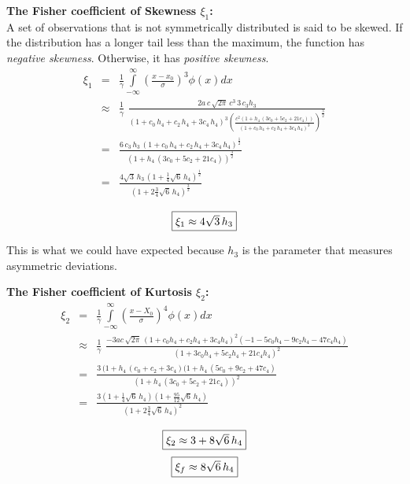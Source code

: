 \documentclass[10pt,a4paper]{report}
\def\ampfac{\left(1+c_0\,h_4+c_2\,h_4+3c_4\,h_4\right)}
\begin{document}
\begin{flushleft}
\vspace{1cm}
{\bf The Fisher coefficient of Skewness $\xi_1$:}\\
A set of observations that is not symmetrically distributed is said to be skewed.
If the distribution has a longer tail less than the maximum,
the function has {\it negative skewness}. Otherwise, it has
{\it positive skewness}.
\begin{eqnarray*}
\xi_1 &=& \frac{1}{\gamma}\int\limits_{-\infty}^{\infty} \left({\frac{x-x_0}{\sigma}}\right)^{3} \phi(x) dx\\
&\approx & \frac{1}{\gamma}\,\,\frac{ 2a\,c\, \sqrt{2\pi}\,c^3\,3\,c_3h_3}
{\ampfac^3 {\left(\frac{c^2\left(1+h_4\,(3c_0+5c_2+21c_4)\right)}{\ampfac^3} \right)}^\frac{3}{2} }\\ 
&=& \frac{6\,c_3\,h_3\, \ampfac^\frac{1}{2} }
{{\left(1+h_4\,(3c_0+5c_2+21c_4)\right)}^\frac{3}{2}}\\
&=& \frac{4\sqrt{3}\,h_3\, {(1+\frac{1}{4}\sqrt{6}\,h_4)}^\frac{1}{2}}
{{\left(1+2\frac{3}{4}\sqrt{6}\,h_4\right)}^\frac{3}{2}}
\end{eqnarray*} 

\begin{equation}
\framebox{$\xi_1 \approx 4\sqrt{3}\,h_3$}
\end{equation} 

This is what we could have expected because $h_3$ is the parameter that
measures asymmetric deviations.

\vspace{1cm}
{\bf The Fisher coefficient of Kurtosis $\xi_2$:}
\begin{eqnarray*}
\xi_2 &=& \frac{1}{\gamma}\int\limits_{-\infty}^{\infty} \left({\frac{x-X_0}{\sigma}}\right)^{4} \phi(x) dx\\
&\approx & \frac{1}{\gamma}\,\, \frac{-3ac\,\sqrt{2\pi}\,{\left(1+c_0h_4+c_2h_4+3c_4h_4 \right)}^2
 \left(-1-5c_0h_4-9c_2h_4-47c_4h_4\right)}
{{\left(1+3c_0h_4+5c_2h_4+21c_4h_4 \right)}^2}\\
&=& \frac{3\,(1+h_4\,(c_0+c_2+3c_4)(1+h_4\,(5c_0+9c_2+47c_4)}
{{\left(1+h_4\,(3c_0+5c_2+21c_4)\right)}^2}\\
&=& \frac{3(1+\frac{1}{4}\sqrt{6}\,h_4)(1+\frac{95}{12}\sqrt{6}\,h_4)}
{{\left(1+2\frac{3}{4}\sqrt{6}\,h_4\right)}^2}
\end{eqnarray*}

\begin{equation}
\framebox{$\xi_2 \approx 3 + 8\sqrt{6}\,h_4$}
\end{equation} 
\begin{equation}
\framebox{$\xi_f \approx 8\sqrt{6}\,h_4$}
\end{equation} 


\end{flushleft}
\end{document}
